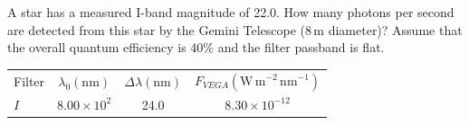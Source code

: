 A star has a measured I-band magnitude of 22.0. How many photons per second are
detected from this star by the Gemini Telescope (8\,m diameter)? Assume that
the overall quantum efficiency is 40\% and the filter passband is flat.

\begin{center}
\begin{tabular}{lccc}
Filter & $\lambda_0(\mathrm{nm})$ & $\Delta\lambda(\mathrm{nm})$
  & $F_{VEGA}(\mathrm{W\,m^{-2}\,nm^{-1}})$ \\
$I$ & $8.00 \times 10^2$ & 24.0 & $8.30 \times 10^{-12}$ \\
\end{tabular}
\end{center}
